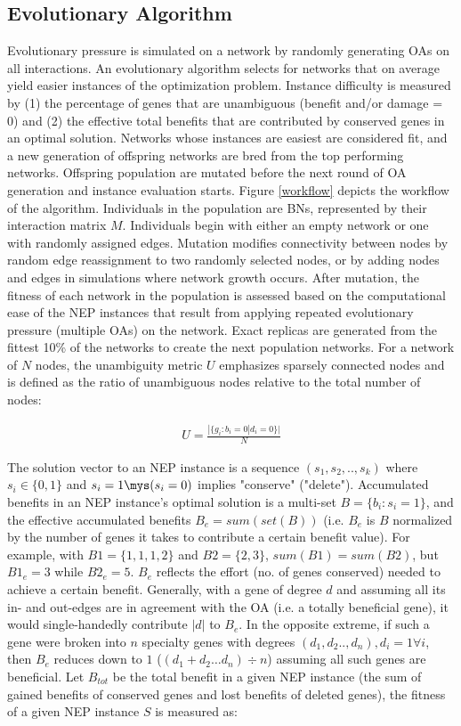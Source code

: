 \subsection{Evolutionary Algorithm}\label{evo_alg}
Evolutionary pressure is simulated on a network by randomly generating OAs on all interactions. An evolutionary algorithm selects for networks that 
on average yield easier instances of the optimization problem. Instance difficulty is measured by (1) the percentage of genes that are unambiguous 
(benefit and/or damage = 0) and (2) the effective total benefits that are contributed by conserved genes in an optimal solution. Networks whose 
instances are easiest are considered fit, and a new generation of offspring networks are bred from the top performing networks. Offspring 
population are mutated before the next round of OA generation and instance evaluation starts. 
Figure \ref{workflow} depicts the workflow of the algorithm. Individuals in the population are BNs, represented by their interaction matrix $M$. 
Individuals begin with either an empty network or one with randomly assigned edges.
 Mutation  modifies connectivity between nodes by random edge reassignment to two randomly selected nodes, or by
 adding nodes and edges in simulations where network growth occurs. After mutation, the fitness of each network in the population is 
 assessed based on the computational 
ease of the NEP instances that result from applying repeated evolutionary pressure (multiple OAs) on the network.
 Exact replicas are generated from the fittest 10\% of the networks to create the next
population networks. %
For a network of $N$ nodes, the unambiguity metric $U$ emphasizes sparsely connected nodes and is defined as the ratio of unambiguous nodes relative to 
the total number of nodes: 

\begin{align*}
U=\frac{|\{g_i:b_i=0|d_i=0\}|}{N}
\end{align*}

The solution vector to an NEP instance is a sequence $(s_1, s_2, .., s_k)$ where $s_i\in\{0,1\}$ 
and $s_i=1 \mys (s_i=0)$ implies "conserve" ("delete").
Accumulated benefits in an NEP instance's optimal solution is a multi-set $B=\{b_i: s_i=1\}$, and the 
effective accumulated benefits $B_e=sum(set(B))$ (i.e. $B_e$ is $B$ normalized by the number of genes it takes 
to contribute a certain benefit value). For example, with $B1=\{1,1,1,2\}$ and $B2=\{2,3\}$, $sum(B1)=sum(B2)$,  but $B1_e=3$ while $B2_e=5$. 
$B_e$ reflects the effort (no. of genes conserved) needed to achieve a certain benefit. Generally, with
a gene of degree $d$ and assuming all its in- and out-edges are in agreement with the OA (i.e. a totally
beneficial gene), it would single-handedly contribute $|d|$ to $B_e$. In the opposite extreme, if such a gene were broken into $n$ specialty genes with degrees
$(d_1, d_2.., d_n), d_i=1 \forall i$, then $B_e$ reduces down to $1$  ($(d_1 + d_2\dots d_n)\div n$) assuming all such genes are beneficial. Let $B_{tot}$ be the total benefit in a given NEP instance (the sum of gained benefits of conserved genes and lost benefits of deleted genes), the fitness of a given NEP instance $S$ is measured as:

